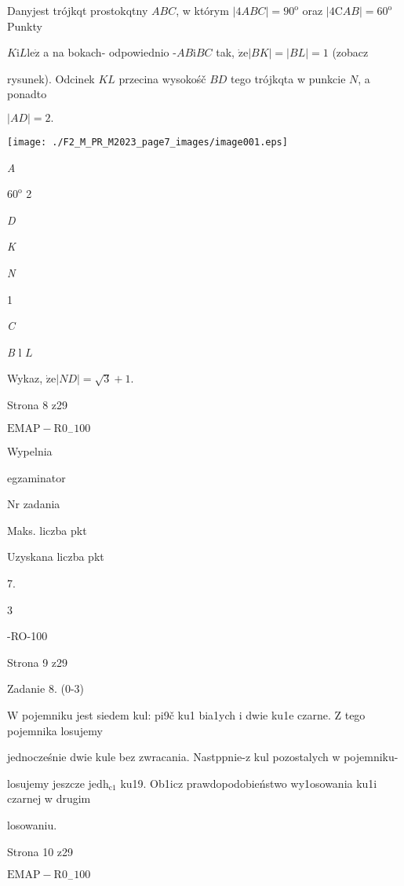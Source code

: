 \documentclass[a4paper,12pt]{article}
\begin{document}
Danyjest trójkqt prostokqtny $ABC$, w którym $|4ABC|=90^{\mathrm{o}}$ oraz $|4\mathrm{C}AB|=60^{\mathrm{o}}$ Punkty

$K \mathrm{i} L \mathrm{l}\mathrm{e}\dot{\mathrm{z}}$ a na bokach- odpowiednio -$AB \mathrm{i} BC$ tak, $\dot{\mathrm{z}}\mathrm{e} |BK|=|BL|=1$ (zobacz

rysunek). Odcinek $KL$ przecina wysokośč $BD$ tego trójkqta w punkcie $N$, a ponadto

$|AD|=2.$
\begin{center}
\texttt{[image: ./F2\_M\_PR\_M2023\_page7\_images/image001.eps]}
\end{center}
{\it A}

$60^{\mathrm{o}}$  2

{\it D}

{\it K}

{\it N}

1

{\it C}

{\it B} l $L$

Wykaz, $\dot{\mathrm{z}}\mathrm{e} |ND|=\sqrt{3}+1.$

Strona 8 z29

$\mathrm{E}\mathrm{M}\mathrm{A}\mathrm{P}-\mathrm{R}0_{-}100$





Wypelnia

egzaminator

Nr zadania

Maks. liczba pkt

Uzyskana liczba pkt

7.

3

-RO-100

Strona 9 z29





Zadanie 8. (0-3)

$\mathrm{W}$ pojemniku jest siedem kul: pi9č ku1 bia1ych i dwie ku1e czarne. $\mathrm{Z}$ tego pojemnika losujemy

jednocześnie dwie kule bez zwracania. Nastppnie-z kul pozostalych w pojemniku-

losujemy jeszcze $\mathrm{j}\mathrm{e}\mathrm{d}\mathrm{h}_{\mathrm{c}1}$ ku19. Ob1icz prawdopodobieństwo wy1osowania ku1i czarnej w drugim

losowaniu.

Strona 10 z29

$\mathrm{E}\mathrm{M}\mathrm{A}\mathrm{P}-\mathrm{R}0_{-}100$
\end{document}
